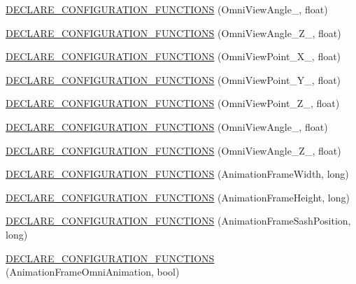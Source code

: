 \begin{DoxyCompactItemize}
\item 
\hyperlink{a00191_a163a1931a2460bee2c216cd38f0f6ac2}{D\-E\-C\-L\-A\-R\-E\-\_\-\-C\-O\-N\-F\-I\-G\-U\-R\-A\-T\-I\-O\-N\-\_\-\-F\-U\-N\-C\-T\-I\-O\-N\-S} (Omni\-View\-Angle\-\_, float)
\item 
\hyperlink{a00191_a62168876ae694967c9192893227152c8}{D\-E\-C\-L\-A\-R\-E\-\_\-\-C\-O\-N\-F\-I\-G\-U\-R\-A\-T\-I\-O\-N\-\_\-\-F\-U\-N\-C\-T\-I\-O\-N\-S} (Omni\-View\-Angle\-\_\-\-Z\-\_, float)
\item 
\hyperlink{a00191_a8849e8dd0c33d19c6e442aee01f5305c}{D\-E\-C\-L\-A\-R\-E\-\_\-\-C\-O\-N\-F\-I\-G\-U\-R\-A\-T\-I\-O\-N\-\_\-\-F\-U\-N\-C\-T\-I\-O\-N\-S} (Omni\-View\-Point\-\_\-\-X\-\_, float)
\item 
\hyperlink{a00191_a11b1bbea237ebc75835308cb86b61fb3}{D\-E\-C\-L\-A\-R\-E\-\_\-\-C\-O\-N\-F\-I\-G\-U\-R\-A\-T\-I\-O\-N\-\_\-\-F\-U\-N\-C\-T\-I\-O\-N\-S} (Omni\-View\-Point\-\_\-\-Y\-\_, float)
\item 
\hyperlink{a00191_a8e2846944d85973420a2709d8cb20341}{D\-E\-C\-L\-A\-R\-E\-\_\-\-C\-O\-N\-F\-I\-G\-U\-R\-A\-T\-I\-O\-N\-\_\-\-F\-U\-N\-C\-T\-I\-O\-N\-S} (Omni\-View\-Point\-\_\-\-Z\-\_, float)
\item 
\hyperlink{a00191_a8a79fc30392a9148cb9ce50ea69f91aa}{D\-E\-C\-L\-A\-R\-E\-\_\-\-C\-O\-N\-F\-I\-G\-U\-R\-A\-T\-I\-O\-N\-\_\-\-F\-U\-N\-C\-T\-I\-O\-N\-S} (Omni\-View\-Angle\-\_, float)
\item 
\hyperlink{a00191_ae9aa64a72dc19d793ffa522586623cb4}{D\-E\-C\-L\-A\-R\-E\-\_\-\-C\-O\-N\-F\-I\-G\-U\-R\-A\-T\-I\-O\-N\-\_\-\-F\-U\-N\-C\-T\-I\-O\-N\-S} (Omni\-View\-Angle\-\_\-\-Z\-\_, float)
\item 
\hyperlink{a00191_a11df28b3c79624b2cf02f5818012d882}{D\-E\-C\-L\-A\-R\-E\-\_\-\-C\-O\-N\-F\-I\-G\-U\-R\-A\-T\-I\-O\-N\-\_\-\-F\-U\-N\-C\-T\-I\-O\-N\-S} (Animation\-Frame\-Width, long)
\item 
\hyperlink{a00191_aa0696ffe58bc2c3d39f0ac7f50073700}{D\-E\-C\-L\-A\-R\-E\-\_\-\-C\-O\-N\-F\-I\-G\-U\-R\-A\-T\-I\-O\-N\-\_\-\-F\-U\-N\-C\-T\-I\-O\-N\-S} (Animation\-Frame\-Height, long)
\item 
\hyperlink{a00191_a6eca8d4b538d25dc5d864646228d6362}{D\-E\-C\-L\-A\-R\-E\-\_\-\-C\-O\-N\-F\-I\-G\-U\-R\-A\-T\-I\-O\-N\-\_\-\-F\-U\-N\-C\-T\-I\-O\-N\-S} (Animation\-Frame\-Sash\-Position, long)
\item 
\hyperlink{a00191_ada8e0c5475bf2b003c8e1f804b7b8d38}{D\-E\-C\-L\-A\-R\-E\-\_\-\-C\-O\-N\-F\-I\-G\-U\-R\-A\-T\-I\-O\-N\-\_\-\-F\-U\-N\-C\-T\-I\-O\-N\-S} (Animation\-Frame\-Omni\-Animation, bool)

\end{DoxyCompactItemize}
